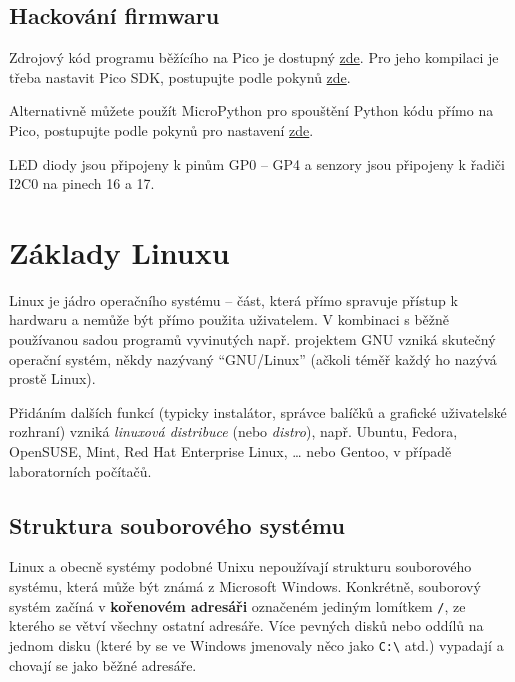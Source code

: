 \subsection{Hackování firmwaru}
Zdrojový kód programu běžícího na Pico je dostupný \href{https://bitbucket.org/emil_varga/picolab/src/master/}{zde}. Pro jeho kompilaci je třeba nastavit Pico SDK, postupujte podle pokynů \href{https://www.raspberrypi.com/documentation/microcontrollers/c_sdk.html}{zde}.

Alternativně můžete použít MicroPython pro spouštění Python kódu přímo na Pico, postupujte podle pokynů pro nastavení \href{https://www.raspberrypi.com/documentation/microcontrollers/micropython.html#what-is-micropython}{zde}.

LED diody jsou připojeny k pinům GP0 -- GP4 a senzory jsou připojeny k řadiči I2C0 na pinech 16 a 17.


\section{Základy Linuxu}

Linux je jádro operačního systému -- část, která přímo spravuje přístup k hardwaru a nemůže být přímo použita uživatelem. V kombinaci s běžně používanou sadou programů vyvinutých např. projektem GNU vzniká skutečný operační systém, někdy nazývaný
``GNU/Linux'' (ačkoli téměř každý ho nazývá prostě Linux).

Přidáním dalších funkcí (typicky instalátor, správce balíčků a grafické uživatelské rozhraní) vzniká \emph{linuxová distribuce} (nebo \emph{distro}), např. Ubuntu, Fedora, OpenSUSE, Mint, Red Hat Enterprise Linux, \ldots{} nebo Gentoo, v případě laboratorních počítačů.

\subsection{Struktura souborového systému}

Linux a obecně systémy podobné Unixu nepoužívají strukturu souborového systému, která může být známá z Microsoft Windows. Konkrétně, souborový systém začíná v \textbf{kořenovém adresáři} označeném jediným lomítkem \verb|/|, ze kterého se větví všechny ostatní adresáře. Více pevných disků nebo oddílů na jednom disku (které by se ve Windows jmenovaly něco jako \verb|C:\| atd.) vypadají a chovají se jako běžné adresáře.

